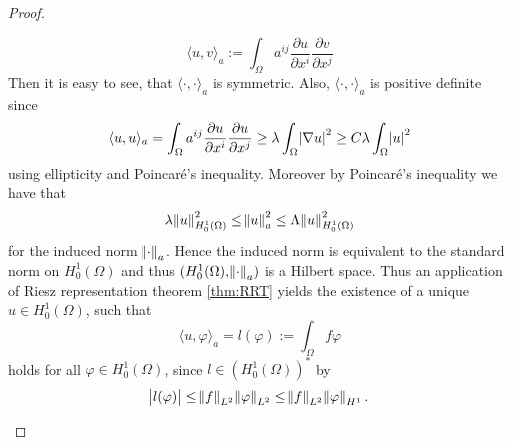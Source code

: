 \begin{proof}
\begin{enumerate}[label = \textit{Step \arabic*:},wide=0pt]
\begin{equation}
				\label{eq:inner_prod}
				\langle u,v \rangle_a := \int_\Omega a^{ij} \frac{\partial u}{\partial x^i}\frac{\partial v}{\partial x^j}
			\end{equation}
			Then it is easy to see, that $\langle \cdot,\cdot\rangle_a$ is symmetric. Also, $\langle \cdot,\cdot \rangle_a$ is positive definite since
			\begin{equation*}
				\langle u,u\rangle_a = \int_\Omega a^{ij} \frac{\partial u}{\partial x^i}\frac{\partial u}{\partial x^j} \geq \lambda \int_\Omega\abs{\nabla u}^2 \geq C \lambda \int_\Omega \abs{u}^2
			\end{equation*}
			\noindent using ellipticity and Poincar\'e's inequality. Moreover by Poincar\'e's inequality we have that
			\begin{equation*}
				\lambda \norm{u}^2_{H^1_0(\Omega)} \leq \norm{u}_a^2 \leq \Lambda \norm{u}_{H^1_0(\Omega)}^2
			\end{equation*}
			\noindent for the induced norm $\norm{\cdot}_a$. Hence the induced norm is equivalent to the standard norm on $H^1_0(\Omega)$ and thus $(H^1_0(\Omega),\norm{\cdot}_a)$ is a Hilbert space. Thus an application of Riesz representation theorem \ref{thm:RRT} yields the existence of a unique $u \in H^1_0(\Omega)$, such that
			\begin{equation*}
				\langle u,\varphi \rangle_a = l(\varphi) := \int_\Omega f \varphi
			\end{equation*}
			\noindent holds for all $\varphi \in H^1_0(\Omega)$, since $l \in (H^1_0(\Omega))^*$ by
			\begin{equation*}
				\abs{l(\varphi)} \leq \norm{f}_{L^2}\norm{\varphi}_{L^2} \leq \norm{f}_{L^2}\norm{\varphi}_{H^1}.
			\end{equation*}
	\end{enumerate}
\end{proof}

